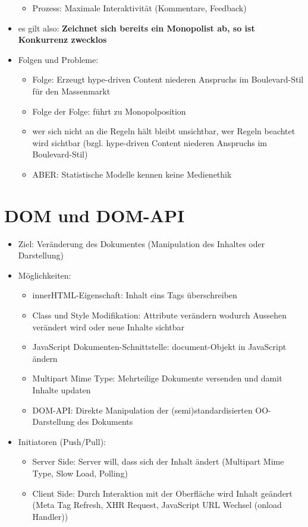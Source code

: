 \documentclass{article} %
\begin{document}
\begin{itemize}
\begin{itemize}
			\item Prozess: Maximale Interaktivität (Kommentare, Feedback)
		\end{itemize}
		\item es gilt also: \textbf{Zeichnet sich bereits ein Monopolist ab, so ist Konkurrenz zwecklos}
		\item Folgen und Probleme:
		\begin{itemize}
			\item Folge: Erzeugt hype-driven Content niederen Anspruchs im Boulevard-Stil für den Massenmarkt
			\item Folge der Folge: führt zu Monopolposition
			\item wer sich nicht an die Regeln hält bleibt unsichtbar, wer Regeln beachtet wird sichtbar (bzgl. hype-driven Content niederen Anspruchs im Boulevard-Stil)
			\item ABER: Statistische Modelle kennen keine Medienethik
		\end{itemize}
	\end{itemize}
	\section{DOM und DOM-API}
	\begin{itemize}
		\item Ziel: Veränderung des Dokumentes (Manipulation des Inhaltes oder Darstellung)
		\item Möglichkeiten:
		\begin{itemize}
			\item innerHTML-Eigenschaft: Inhalt eins Tags überschreiben
			\item Class und Style Modifikation: Attribute verändern wodurch Aussehen verändert wird oder neue Inhalte sichtbar
			\item JavaScript Dokumenten-Schnittstelle: document-Objekt in JavaScript ändern
			\item Multipart Mime Type: Mehrteilige Dokumente versenden und damit Inhalte updaten
			\item DOM-API: Direkte Manipulation der (semi)standardisierten OO-Darstellung des Dokuments
		\end{itemize}
		\item Initiatoren (Push/Pull):
		\begin{itemize}
			\item Server Side: Server will, dass sich der Inhalt ändert (Multipart Mime Type, Slow Load, Polling)
			\item Client Side: Durch Interaktion mit der Oberfläche wird Inhalt geändert (Meta Tag Refresh, XHR Request, JavaScript URL Wechsel (onload Handler))
		\end{itemize}
	\end{itemize}
\end{document}
